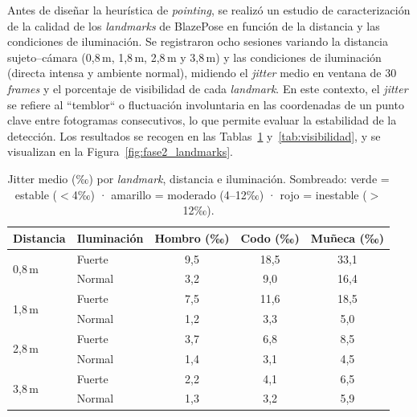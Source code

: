 \documentclass[12pt]{report} %
\begin{document}
Antes de diseñar la heurística de \textit{pointing}, se realizó un estudio de caracterización de la calidad de los \textit{landmarks} de BlazePose en función de la distancia y las condiciones de iluminación. Se registraron ocho sesiones variando la distancia sujeto--cámara (0{,}8\,m, 1{,}8\,m, 2{,}8\,m y 3{,}8\,m) y las condiciones de iluminación (directa intensa y ambiente normal), midiendo el \textit{jitter} medio en ventana de 30 \textit{frames} y el porcentaje de visibilidad de cada \textit{landmark}. En este contexto, el \textit{jitter} se refiere al ``temblor`` o fluctuación involuntaria en las coordenadas de un punto clave entre fotogramas consecutivos, lo que permite evaluar la estabilidad de la detección. Los resultados se recogen en las Tablas~\ref{tab:jitter} y~\ref{tab:visibilidad}, y se visualizan en la Figura~\ref{fig:fase2_landmarks}.

\begin{table}[H]
\caption{\label{tab:jitter}Jitter medio (‰) por \textit{landmark}, distancia e iluminación. Sombreado: \colorbox{green!25}{verde} = estable ($<$4‰) · \colorbox{yellow!35}{amarillo} = moderado (4--12‰) · \colorbox{red!20}{rojo} = inestable ($>$12‰).}
\begin{tabular}{llccc}
\hline
\textbf{Distancia} & \textbf{Iluminación} & \textbf{Hombro (‰)} & \textbf{Codo (‰)} & \textbf{Muñeca (‰)} \\
\hline
\multirow{2}{*}{0{,}8\,m}
  & Fuerte & \cellcolor{yellow!35}9{,}5  & \cellcolor{red!20}18{,}5  & \cellcolor{red!20}33{,}1 \\
  & Normal & \cellcolor{green!25}3{,}2  & \cellcolor{yellow!35}9{,}0 & \cellcolor{red!20}16{,}4 \\
\hline
\multirow{2}{*}{1{,}8\,m}
  & Fuerte & \cellcolor{yellow!35}7{,}5  & \cellcolor{yellow!35}11{,}6 & \cellcolor{red!20}18{,}5 \\
  & Normal & \cellcolor{green!25}1{,}2  & \cellcolor{green!25}3{,}3  & \cellcolor{yellow!35}5{,}0 \\
\hline
\multirow{2}{*}{2{,}8\,m}
  & Fuerte & \cellcolor{green!25}3{,}7  & \cellcolor{yellow!35}6{,}8  & \cellcolor{yellow!35}8{,}5 \\
  & Normal & \cellcolor{green!25}1{,}4  & \cellcolor{green!25}3{,}1  & \cellcolor{yellow!35}4{,}5 \\
\hline
\multirow{2}{*}{3{,}8\,m}
  & Fuerte & \cellcolor{green!25}2{,}2  & \cellcolor{yellow!35}4{,}1  & \cellcolor{yellow!35}6{,}5 \\
  & Normal & \cellcolor{green!25}1{,}3  & \cellcolor{green!25}3{,}2  & \cellcolor{yellow!35}5{,}9 \\
\hline
\end{tabular}
\end{table}
\end{document}
